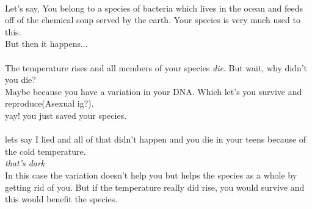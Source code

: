 \documentclass[A4]{article}
\begin{document}
    \paragraph{}
    Let's say,
    You belong to a species of bacteria which lives in the ocean and feeds off of the chemical soup served by the earth.
    Your species is very much used to this. \\ 
    But then it happens... \\
     \\
    The temperature rises and all members of your species \emph{die}. But wait, why didn't you die? \\
    Maybe because you have a variation in your DNA. Which let's you survive and reproduce(Asexual ig?). \\
    yay! you just saved your species.\\
     \\
    lets say I lied and all of that didn't happen and you die in your teens because of the cold temperature.\\
    \emph{that's dark}\\
    In this case the variation doesn't help you but helps the species as a whole by getting rid of you.
     But if the temperature really did rise, you would survive and this would benefit the species.
\end{document}
